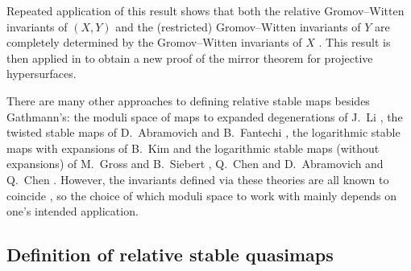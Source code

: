 Repeated application of this result shows that both the relative Gromov--Witten invariants of $(X,Y)$ and the (restricted) Gromov--Witten invariants of $Y$ are completely determined by the Gromov--Witten invariants of $X$ \cite[Corollary 5.7]{Ga}. This result is then applied in \cite{Ga-MF} to obtain a new proof of the mirror theorem for projective hypersurfaces.

\begin{remark} There are many other approaches to defining relative stable maps besides Gathmann's: the moduli space of maps to expanded degenerations of J.~Li \cite{Li1} \cite{Li2}, the twisted stable maps of D.~Abramovich and B.~Fantechi \cite{AbramovichFantechi}, the logarithmic stable maps with expansions of B.~Kim \cite{KimLog} and the logarithmic stable maps (without expansions) of M.~Gross and B.~Siebert \cite{GrossSiebertLog} \cite{GrossSiebertIntrinsic}, Q.~Chen \cite{ChenLog} and D.~Abramovich and Q.~Chen \cite{AbramovichChenLog}. However, the invariants defined via these theories are all known to coincide \cite{AbramovichMarcusWiseComparison} \cite{GathmannThesis}, so the choice of which moduli space to work with mainly depends on one's intended application. \end{remark}

\subsection{Definition of relative stable quasimaps} \label{Subsection relative stable quasimaps}

